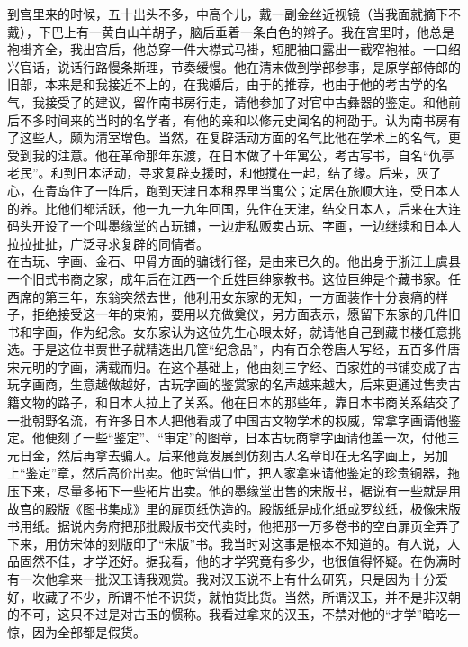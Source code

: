 到宫里来的时候，五十出头不多，中高个儿，戴一副金丝近视镜（当我面就摘下不戴），下巴上有一黄白山羊胡子，脑后垂着一条白色的辫子。我在宫里时，他总是袍褂齐全，我出宫后，他总穿一件大襟式马褂，短肥袖口露出一截窄袍袖。一口绍兴官话，说话行路慢条斯理，节奏缓慢。他在清末做到学部参事，是原学部侍郎的旧部，本来是和我接近不上的，在我婚后，由于的推荐，也由于他的考古学的名气，我接受了的建议，留作南书房行走，请他参加了对官中古彝器的鉴定。和他前后不多时间来的当时的名学者，有他的亲和以修元史闻名的柯劭于。认为南书房有了这些人，颇为清室增色。当然，在复辟活动方面的名气比他在学术上的名气，更受到我的注意。他在革命那年东渡，在日本做了十年寓公，考古写书，自名“仇亭老民”。和到日本活动，寻求复辟支援时，和他搅在一起，结了缘。后来，灰了心，在青岛住了一阵后，跑到天津日本租界里当寓公；定居在旅顺大连，受日本人的养。比他们都活跃，他一九一九年回国，先住在天津，结交日本人，后来在大连码头开设了一个叫墨缘堂的古玩铺，一边走私贩卖古玩、字画，一边继续和日本人拉拉扯扯，广泛寻求复辟的同情者。\\

在古玩、字画、金石、甲骨方面的骗钱行径，是由来已久的。他出身于浙江上虞县一个旧式书商之家，成年后在江西一个丘姓巨绅家教书。这位巨绅是个藏书家。任西席的第三年，东翁突然去世，他利用女东家的无知，一方面装作十分哀痛的样子，拒绝接受这一年的束俯，要用以充做奠仪，另方面表示，愿留下东家的几件旧书和字画，作为纪念。女东家认为这位先生心眼太好，就请他自己到藏书楼任意挑选。于是这位书贾世子就精选出几筐“纪念品”，内有百余卷唐人写经，五百多件唐宋元明的字画，满载而归。在这个基础上，他由刻三字经、百家姓的书铺变成了古玩字画商，生意越做越好，古玩字画的鉴赏家的名声越来越大，后来更通过售卖古籍文物的路子，和日本人拉上了关系。他在日本的那些年，靠日本书商关系结交了一批朝野名流，有许多日本人把他看成了中国古文物学术的权威，常拿字画请他鉴定。他便刻了一些“鉴定”、“审定”的图章，日本古玩商拿字画请他盖一次，付他三元日金，然后再拿去骗人。后来他竟发展到仿刻古人名章印在无名字画上，另加上“鉴定”章，然后高价出卖。他时常借口忙，把人家拿来请他鉴定的珍贵铜器，拖压下来，尽量多拓下一些拓片出卖。他的墨缘堂出售的宋版书，据说有一些就是用故宫的殿版《图书集成》里的扉页纸伪造的。殿版纸是成化纸或罗纹纸，极像宋版书用纸。据说内务府把那批殿版书交代卖时，他把那一万多卷书的空白扉页全弄了下来，用仿宋体的刻版印了“宋版”书。我当时对这事是根本不知道的。有人说，人品固然不佳，才学还好。据我看，他的才学究竟有多少，也很值得怀疑。在伪满时有一次他拿来一批汉玉请我观赏。我对汉玉说不上有什么研究，只是因为十分爱好，收藏了不少，所谓不怕不识货，就怕货比货。当然，所谓汉玉，并不是非汉朝的不可，这只不过是对古玉的惯称。我看过拿来的汉玉，不禁对他的“才学”暗吃一惊，因为全部都是假货。\\

